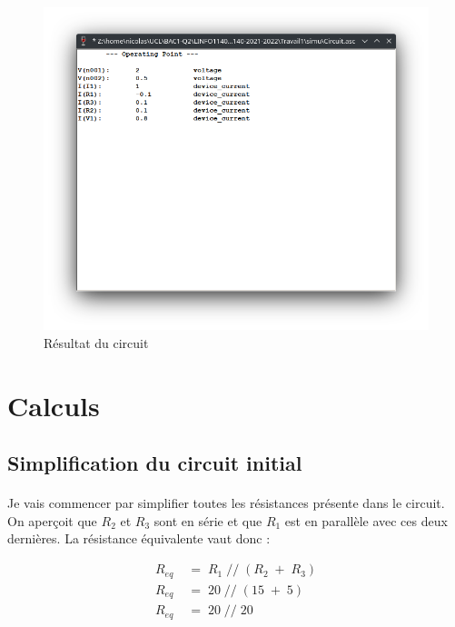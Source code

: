     \begin{figure}[H]
        \centering
        \includegraphics[scale=0.5]{../pictures/resultat.png} %
        \caption{Résultat du circuit}
    \end{figure}




\section{Calculs}

\subsection{Simplification du circuit initial}

    \paragraph{}Je vais commencer par simplifier toutes les résistances présente dans le circuit. On aperçoit que
    $R_2$ et $R_3$ sont en série et que $R_1$ est en parallèle avec ces deux dernières. La résistance équivalente vaut 
    donc : 

        {\color{info}\begin{align*}
            R_{eq}\;&=\;R_{1}\;//\;(R_{2}\;+\;R_{3}) \\
            R_{eq}\;&=\;20\;//\;(15\;+\;5) \\
            R_{eq}\;&=\;20\;//\;20
        \end{align*}}
        

